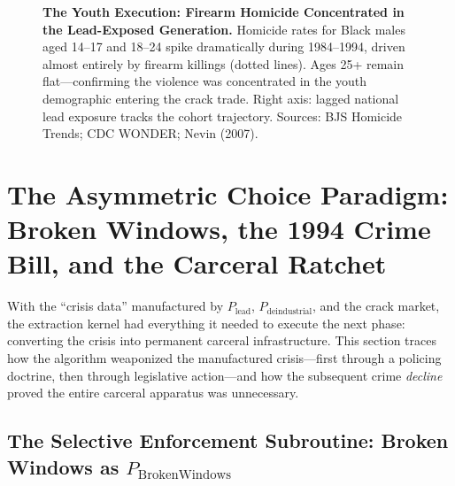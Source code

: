 \documentclass[12pt,openany]{book}
\begin{document}
\begin{figure}[htbp]
\caption{\textbf{The Youth Execution: Firearm Homicide Concentrated in the Lead-Exposed Generation.} Homicide rates for Black males aged 14--17 and 18--24 spike dramatically during 1984--1994, driven almost entirely by firearm killings (dotted lines). Ages 25+ remain flat---confirming the violence was concentrated in the youth demographic entering the crack trade. Right axis: lagged national lead exposure tracks the cohort trajectory. Sources: BJS Homicide Trends; CDC WONDER; Nevin (2007).}
\label{fig:youth_homicide}
\end{figure}

\section{The Asymmetric Choice Paradigm: Broken Windows, the 1994 Crime Bill, and the Carceral Ratchet}

With the ``crisis data'' manufactured by $P_{\text{lead}}$, $P_{\text{deindustrial}}$, and the crack market, the extraction kernel had everything it needed to execute the next phase: converting the crisis into permanent carceral infrastructure. This section traces how the algorithm weaponized the manufactured crisis---first through a policing doctrine, then through legislative action---and how the subsequent crime \textit{decline} proved the entire carceral apparatus was unnecessary.

\subsection{The Selective Enforcement Subroutine: Broken Windows as \texorpdfstring{$P_{\text{BrokenWindows}}$}{P\_BrokenWindows}}
\end{document}
